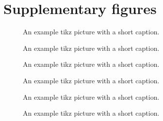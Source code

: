 \chapter{Supplementary figures}

\begin{figure}[H]
  \centering
  \caption{An example tikz picture with a short caption.}
  \label{fig:tikz example short}
\end{figure}

\begin{figure}[H]
  \centering
  \caption{An example tikz picture with a short caption.}
  \label{fig:tikz example short}
\end{figure}

\begin{figure}[H]
  \centering
  \caption{An example tikz picture with a short caption.}
  \label{fig:tikz example short}
\end{figure}

\begin{figure}[H]
  \centering
  \caption{An example tikz picture with a short caption.}
  \label{fig:tikz example short}
\end{figure}

\begin{figure}[H]
  \centering
  \caption{An example tikz picture with a short caption.}
  \label{fig:tikz example short}
\end{figure}

\begin{figure}[H]
  \centering
  \caption{An example tikz picture with a short caption.}
  \label{fig:tikz example short}
\end{figure}

